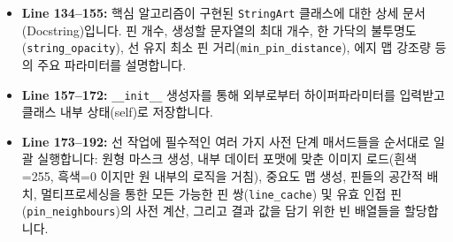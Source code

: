 \begin{itemize}
\item \textbf{Line 134--155:} 핵심 알고리즘이 구현된 \texttt{StringArt} 클래스에 대한 상세 문서(Docstring)입니다. 핀 개수, 생성할 문자열의 최대 개수, 한 가닥의 불투명도(\texttt{string\_opacity}), 선 유지 최소 핀 거리(\texttt{min\_pin\_distance}), 에지 맵 강조량 등의 주요 파라미터를 설명합니다.
\item \textbf{Line 157--172:} \texttt{\_\_init\_\_} 생성자를 통해 외부로부터 하이퍼파라미터를 입력받고 클래스 내부 상태(self)로 저장합니다. 
\item \textbf{Line 173--192:} 선 작업에 필수적인 여러 가지 사전 단계 매서드들을 순서대로 일괄 실행합니다: 원형 마스크 생성, 내부 데이터 포맷에 맞춘 이미지 로드(흰색=255, 흑색=0 이지만 원 내부의 로직을 거침), 중요도 맵 생성, 핀들의 공간적 배치, 멀티프로세싱을 통한 모든 가능한 핀 쌍(\texttt{line\_cache}) 및 유효 인접 핀(\texttt{pin\_neighbours})의 사전 계산, 그리고 결과 값을 담기 위한 빈 배열들을 할당합니다.
\end{itemize}

